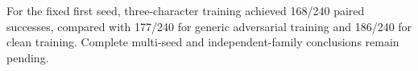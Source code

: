 For the fixed first seed, three-character training achieved 168/240 paired successes, compared with 177/240 for generic adversarial training and 186/240 for clean training. Complete multi-seed and independent-family conclusions remain pending.
